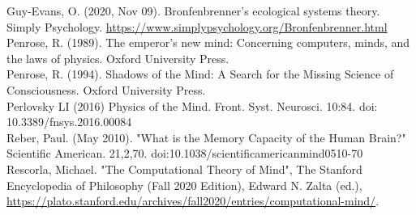 \documentclass[11pt]{article}
\theoremstyle{plain}
\begin{document}
Guy-Evans, O. (2020, Nov 09). Bronfenbrenner's ecological systems theory. Simply Psychology. \url{https://www.simplypsychology.org/Bronfenbrenner.html}\\ 

Penrose, R. (1989). The emperor's new mind: Concerning computers, minds, and the laws of physics. Oxford University Press.\\

Penrose, R. (1994). Shadows of the Mind: A Search for the Missing Science of Consciousness. Oxford University Press.\\

Perlovsky LI (2016) Physics of the Mind. Front. Syst. Neurosci. 10:84. doi: 10.3389/fnsys.2016.00084\\

Reber, Paul. (May 2010). "What is the Memory Capacity of the Human Brain?"
Scientific American. 21,2,70. doi:10.1038/scientificamericanmind0510-70\\

Rescorla, Michael. "The Computational Theory of Mind", The Stanford Encyclopedia of Philosophy (Fall 2020 Edition), Edward N. Zalta (ed.),  \url{https://plato.stanford.edu/archives/fall2020/entries/computational-mind/}.\\
\end{document}
